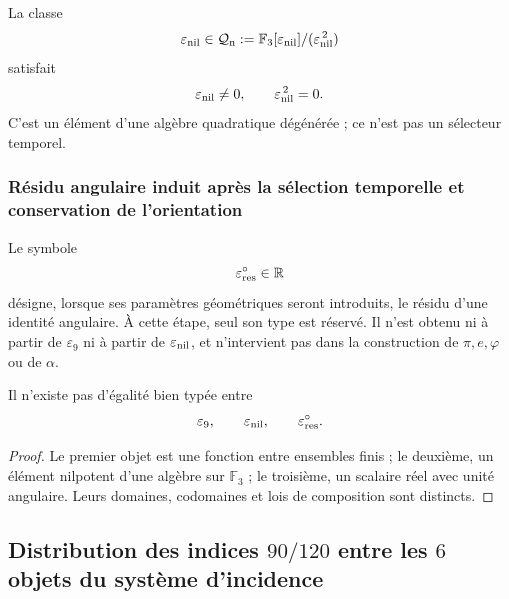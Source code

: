 {La classe
\begin{equation}
 \varepsilon_{\rm nil}
 \in
 \mathcal Q_{\rm n}:=
 \mathbb F_3[\varepsilon_{\rm nil}]
 /(\varepsilon_{\rm nil}^{\,2})
 \label{p12-83-c1-s7:eq:u006e-epsilon-nilpotente}
\end{equation}
satisfait
\begin{equation}
 \varepsilon_{\rm nil}\neq0,
 \qquad
 \varepsilon_{\rm nil}^{\,2}=0.
 \label{p12-83-c1-s7:eq:u006e-epsilon-nilpotente-relacion}
\end{equation}
C’est un élément d’une algèbre quadratique dégénérée ; ce n’est pas un sélecteur
temporel.

\subsubsection{Résidu angulaire induit après la sélection temporelle et conservation de l’orientation}

Le symbole
\begin{equation}
 \varepsilon_{\rm res}^{\circ}\in\mathbb R
 \label{p12-83-c1-s7:eq:u006e-epsilon-residual-tipo}
\end{equation}
désigne, lorsque ses paramètres géométriques seront introduits, le résidu d’une
identité angulaire. À cette étape, seul son type est réservé. Il n’est obtenu
ni à partir de \(\varepsilon_9\) ni à partir de
\(\varepsilon_{\rm nil}\), et n’intervient pas dans la construction de
\(\pi,e,\varphi\) ou de \(\alpha\).

\begin{proposition}
\label{p12-83-c1-s7:prop:u006e-no-identificacion-epsilon}
Il n’existe pas d’égalité bien typée entre
\[
 \varepsilon_9,\qquad
 \varepsilon_{\rm nil},\qquad
 \varepsilon_{\rm res}^{\circ}.
\]
\end{proposition}

\begin{proof}
Le premier objet est une fonction entre ensembles finis ; le deuxième, un
élément nilpotent d’une algèbre sur \(\mathbb F_3\) ; le troisième, un
scalaire réel avec unité angulaire. Leurs domaines, codomaines et lois de
composition sont distincts.
\end{proof}

\subsection{Distribution des indices \(90/120\) entre les \(6\) objets du système d’incidence}

}
